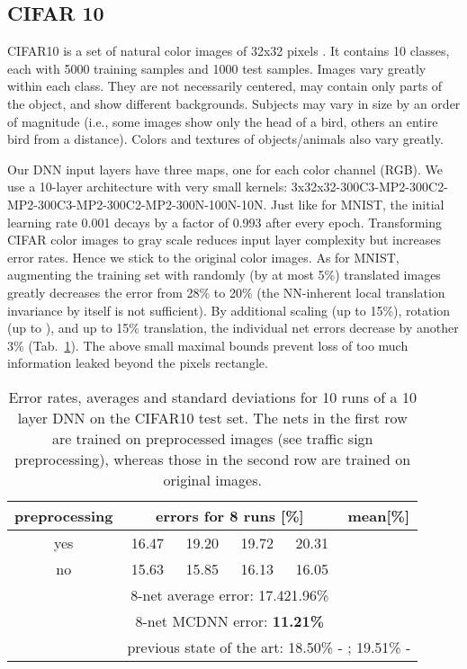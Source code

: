 \documentclass[a4paper]{article}
\begin{document}
\subsection{CIFAR 10}
CIFAR10 is a set of  natural color images of 32x32 pixels \cite{krizhevsky:2009}. It contains 10 classes, each with 5000 training samples and 1000 test samples. Images vary greatly within each class. They are not necessarily centered, may contain only parts of the object, and show different backgrounds. Subjects may vary in size by an order of magnitude (i.e., some images show only the head of a bird, others an entire bird from a distance). Colors and textures of objects/animals also vary greatly.
 
Our DNN input layers have three maps, one for each color channel (RGB).  We use a 10-layer architecture with very small kernels:  3x32x32-300C3-MP2-300C2-MP2-300C3-MP2-300C2-MP2-300N-100N-10N. Just like for MNIST, the initial learning rate 0.001 decays by a factor of 0.993 after every epoch. Transforming CIFAR color images to gray scale reduces input layer complexity but increases error rates. Hence we stick to the original color images. As for MNIST, augmenting the training set with randomly (by at most 5\%) translated  images greatly decreases the error from 28\% to 20\% (the NN-inherent local translation invariance by itself is not sufficient). By additional scaling (up to 15\%), rotation (up to ), and up to 15\% translation, the individual net errors decrease by another 3\% (Tab.~\ref{tab:CIFAR10}). The above small maximal bounds prevent loss of too much information leaked beyond the  pixels rectangle. 

\begin{table}[!t]
\caption{Error rates, averages and standard deviations for 10 runs of a
10 layer DNN on the CIFAR10 test set. The nets in the first row are trained on preprocessed images (see  traffic sign preprocessing), whereas those in the second row are trained on original images.}
\label{tab:CIFAR10}
\footnotesize
\centering
\begin{tabular}{c|cccc|c}
preprocessing	& \multicolumn{4}{c}{errors for 8 runs [\%]}				&	mean[\%]			\\
\hline
yes 			&	16.47	&	19.20	&	19.72	&	20.31	&			\\
no 			&	15.63	&	15.85	&	16.13	&	16.05	&			\\
\hline
			& \multicolumn{4}{c}{8-net average error:	17.421.96\%}\\
\hline
			& \multicolumn{4}{c}{8-net MCDNN error:	\bf{11.21\%}}\\
\hline
			&	 \multicolumn{5}{c}{previous state of the art: 18.50\% - \cite{CoatesICML:2011}; 19.51\% - \cite{Ciresan:2011a}}\\
\end{tabular}
\end{table}
\end{document}
